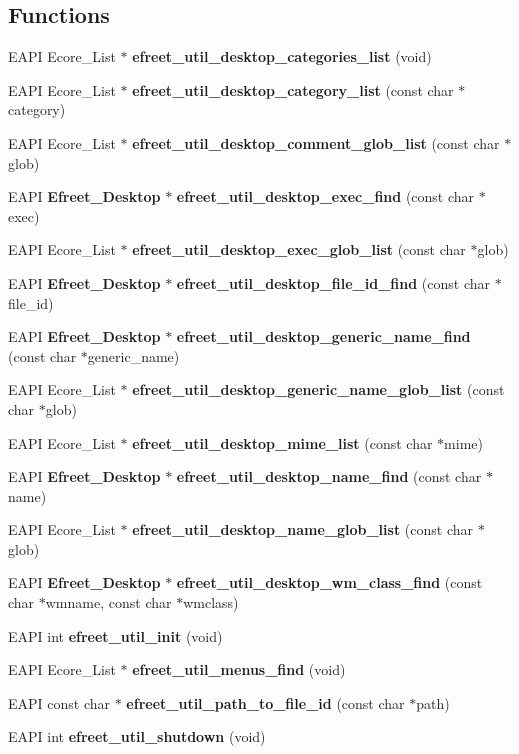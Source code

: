 \subsection*{Functions}
\begin{CompactItemize}
\item 
EAPI Ecore\_\-List $\ast$ {\bf efreet\_\-util\_\-desktop\_\-categories\_\-list} (void)
\item 
EAPI Ecore\_\-List $\ast$ {\bf efreet\_\-util\_\-desktop\_\-category\_\-list} (const char $\ast$category)
\item 
EAPI Ecore\_\-List $\ast$ {\bf efreet\_\-util\_\-desktop\_\-comment\_\-glob\_\-list} (const char $\ast$glob)
\item 
EAPI {\bf Efreet\_\-Desktop} $\ast$ {\bf efreet\_\-util\_\-desktop\_\-exec\_\-find} (const char $\ast$exec)
\item 
EAPI Ecore\_\-List $\ast$ {\bf efreet\_\-util\_\-desktop\_\-exec\_\-glob\_\-list} (const char $\ast$glob)
\item 
EAPI {\bf Efreet\_\-Desktop} $\ast$ {\bf efreet\_\-util\_\-desktop\_\-file\_\-id\_\-find} (const char $\ast$file\_\-id)
\item 
EAPI {\bf Efreet\_\-Desktop} $\ast$ {\bf efreet\_\-util\_\-desktop\_\-generic\_\-name\_\-find} (const char $\ast$generic\_\-name)
\item 
EAPI Ecore\_\-List $\ast$ {\bf efreet\_\-util\_\-desktop\_\-generic\_\-name\_\-glob\_\-list} (const char $\ast$glob)
\item 
EAPI Ecore\_\-List $\ast$ {\bf efreet\_\-util\_\-desktop\_\-mime\_\-list} (const char $\ast$mime)
\item 
EAPI {\bf Efreet\_\-Desktop} $\ast$ {\bf efreet\_\-util\_\-desktop\_\-name\_\-find} (const char $\ast$name)
\item 
EAPI Ecore\_\-List $\ast$ {\bf efreet\_\-util\_\-desktop\_\-name\_\-glob\_\-list} (const char $\ast$glob)
\item 
EAPI {\bf Efreet\_\-Desktop} $\ast$ {\bf efreet\_\-util\_\-desktop\_\-wm\_\-class\_\-find} (const char $\ast$wmname, const char $\ast$wmclass)
\item 
EAPI int {\bf efreet\_\-util\_\-init} (void)
\item 
EAPI Ecore\_\-List $\ast$ {\bf efreet\_\-util\_\-menus\_\-find} (void)
\item 
EAPI const char $\ast$ {\bf efreet\_\-util\_\-path\_\-to\_\-file\_\-id} (const char $\ast$path)
\item 
EAPI int {\bf efreet\_\-util\_\-shutdown} (void)
\end{CompactItemize}
